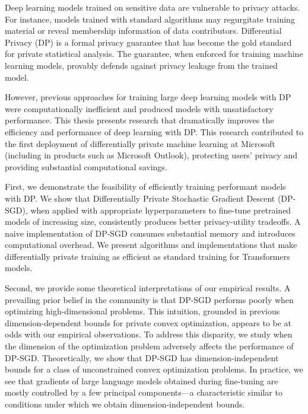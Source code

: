 
Deep learning models trained on sensitive data are vulnerable to privacy attacks.
For instance, models trained with standard algorithms may regurgitate training material or reveal membership information of data contributors.
Differential Privacy (DP) is a formal privacy guarantee that has become the gold standard for private statistical analysis.
The guarantee, when enforced for training machine learning models, provably defends against privacy leakage from the trained model.

However, previous approaches for training large deep learning models with DP were computationally inefficient and produced models with unsatisfactory performance. 
This thesis presents research that dramatically improves the efficiency and performance of deep learning with DP.
This research contributed to the first deployment of differentially private machine learning at Microsoft (including in products such as Microsoft Outlook), protecting users' privacy and providing substantial computational savings.

First, we demonstrate the feasibility of efficiently training performant models with DP. 
We show that Differentially Private Stochastic Gradient Descent (DP-SGD), when applied with appropriate hyperparameters to fine-tune pretrained models of increasing size, consistently produces better privacy-utility tradeoffs. A naive implementation of DP-SGD consumes substantial memory and introduces computational overhead. We present algorithms and implementations that make differentially private training as efficient as standard training for Transformers models.

Second, we provide some theoretical interpretations of our empirical results.
A prevailing prior belief in the community is that DP-SGD performs poorly when optimizing high-dimensional problems. This intuition, grounded in previous dimension-dependent bounds for private convex optimization, appears to be at odds with our empirical observations. To address this disparity, we study when the dimension of the optimization problem adversely affects the performance of DP-SGD. Theoretically, we show that DP-SGD has dimension-independent bounds for a class of unconstrained convex optimization problems. 
In practice, we see that gradients of large language models obtained during fine-tuning are mostly controlled by a few principal components---a characteristic similar to conditions under which we obtain dimension-independent bounds.
